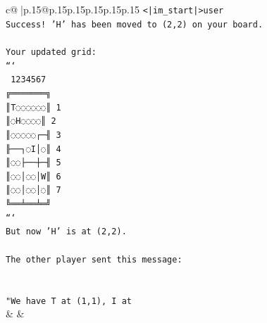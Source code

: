 \documentclass{article}
\begin{document}
{\begin{supertabular}{c@{$\;$}|p{.15\linewidth}@{}p{.15\linewidth}p{.15\linewidth}p{.15\linewidth}p{.15\linewidth}p{.15\linewidth}}
{{{\texttt{<|im\_start|>user} \\
\texttt{Success! 'H' has been moved to (2,2) on your board.} \\
\\ 
\texttt{Your updated grid:} \\
\texttt{```} \\
\texttt{ 1234567} \\
\texttt{╔═══════╗} \\
\texttt{║T◌◌◌◌◌◌║ 1} \\
\texttt{║◌H◌◌◌◌║ 2} \\
\texttt{║◌◌◌◌◌┌─╢ 3} \\
\texttt{╟──┐◌I│◌║ 4} \\
\texttt{║◌◌├──┼─╢ 5} \\
\texttt{║◌◌│◌◌│W║ 6} \\
\texttt{║◌◌│◌◌│◌║ 7} \\
\texttt{╚══╧══╧═╝} \\
\texttt{```} \\
\texttt{But now 'H' is at (2,2).} \\
\\ 
\texttt{The other player sent this message:} \\
\\ 
\\ 
\texttt{"We have T at (1,1), I at} \\
            }
        }
    }
    & & \\ \\


\end{supertabular}}
\end{document}
